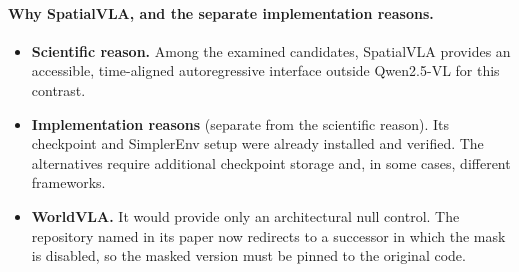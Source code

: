 \paragraph{Why SpatialVLA, and the separate implementation reasons.}
\begin{itemize}
\item \textbf{Scientific reason.} Among the examined candidates, SpatialVLA provides an accessible, time-aligned autoregressive interface outside Qwen2.5-VL for this contrast.
\item \textbf{Implementation reasons} (separate from the scientific reason). Its checkpoint and SimplerEnv setup were already installed and verified. The alternatives require additional checkpoint storage and, in some cases, different frameworks.
\item \textbf{WorldVLA.} It would provide only an architectural null control. The repository named in its paper now redirects to a successor in which the mask is disabled, so the masked version must be pinned to the original code.
\end{itemize}
